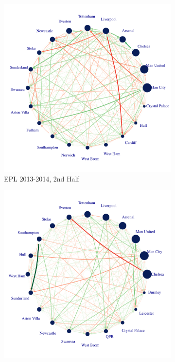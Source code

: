 \documentclass[12pt,a4paper,twoside,openany]{book}\usepackage[]{graphicx}\usepackage[]{color}
\makeatletter
\def\maxwidth{ %
  \ifdim\Gin@nat@width>\linewidth
    \linewidth
  \else
    \Gin@nat@width
  \fi
}
\newenvironment{knitrout}{}{} %
\makeatother
\begin{document}
\begin{figure}[H]
\begin{subfigure}{0.40\textwidth}
\begin{knitrout}
{\centering \includegraphics[width=\maxwidth]{figure/unnamed-chunk-8-1} 

}



\end{knitrout}
\caption{EPL 2013-2014, 2nd Half} 
\end{subfigure}
\hspace*{\fill}

\hspace*{\fill}
\begin{subfigure}{0.40\textwidth}
\begin{knitrout}
\color{fgcolor}

{\centering \includegraphics[width=\maxwidth]{figure/unnamed-chunk-9-1} 

}
\end{knitrout}
\end{subfigure}
\end{figure}
\end{document}
